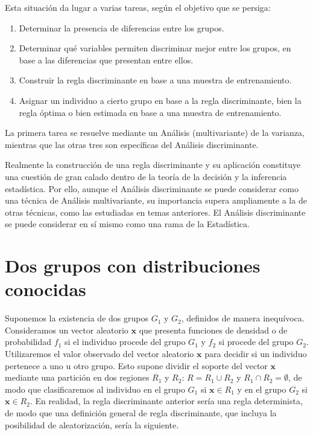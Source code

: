 \documentclass[
  a4paper,
  oneside]{scrbook}
\theoremstyle{definition}
\theoremstyle{definition}
\theoremstyle{definition}
\theoremstyle{definition}
\theoremstyle{remark}
\begin{document}
Esta situación da lugar a varias tareas, según el objetivo que se
persiga:

\begin{enumerate}
\def\labelenumi{\arabic{enumi}.}
\item
  Determinar la presencia de diferencias entre los grupos.
\item
  Determinar qué variables permiten discriminar mejor entre los
  grupos, en base a las diferencias que presentan entre ellos.
\item
  Construir la regla discriminante en base a una muestra de
  entrenamiento.
\item
  Asignar un individuo a cierto grupo en base a la regla
  discriminante, bien la regla óptima o bien estimada en base a una
  muestra de entrenamiento.
\end{enumerate}

La primera tarea se resuelve mediante un Análisis (multivariante) de la
varianza, mientras que las otras tres son específicas del Análisis
discriminante.

Realmente la construcción de una regla discriminante y su aplicación
constituye una cuestión de gran calado dentro de la teoría de la
decisión y la inferencia estadística. Por ello, aunque el Análisis
discriminante se puede considerar como una técnica de Análisis
multivariante, su importancia supera ampliamente a la de otras técnicas,
como las estudiadas en temas anteriores. El Análisis discriminante se
puede considerar en sí mismo como una rama de la Estadística.

\section{Dos grupos con distribuciones conocidas}\label{dos-grupos-con-distribuciones-conocidas}

Suponemos la existencia de dos grupos \(G_1\) y \(G_2\), definidos de manera
inequívoca. Consideramos un vector aleatorio \(\bm{x}\) que presenta
funciones de densidad o de probabilidad \(f_1\) si el individuo procede
del grupo \(G_1\) y \(f_2\) si procede del grupo \(G_2\). Utilizaremos el
valor observado del vector aleatorio \(\bm{x}\) para decidir si un
individuo pertenece a uno u otro grupo. Esto supone dividir el soporte
del vector \(\bm{x}\) mediante una partición en dos regiones \(R_1\) y
\(R_2\): \(R=R_1\cup R_2\) y \(R_1\cap R_2=\emptyset\), de modo que
clasificaremos al individuo en el grupo \(G_1\) si \(\bm{x}\in R_1\) y en el
grupo \(G_2\) si \(\bm{x}\in R_2\). En realidad, la regla discriminante
anterior sería una regla determinista, de modo que una definición
general de regla discriminante, que incluya la posibilidad de
aleatorización, sería la siguiente.
\end{document}
